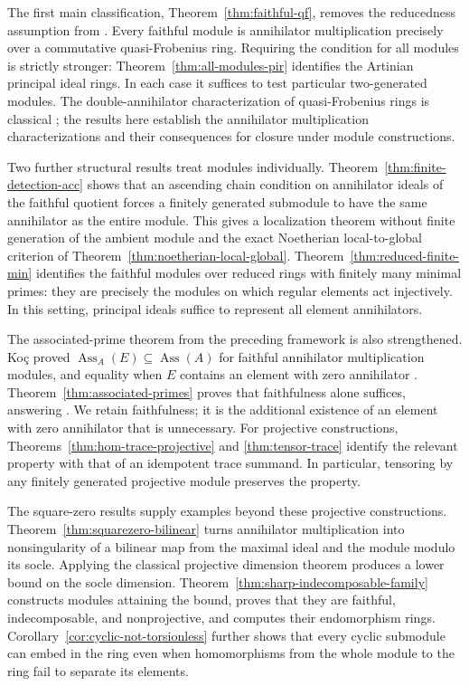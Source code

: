 \documentclass[11pt]{amsart}
\theoremstyle{plain}
\theoremstyle{definition}
\theoremstyle{remark}
\DeclareMathOperator{\Ass}{Ass}
\numberwithin{equation}{section}
\begin{document}
The first main classification, Theorem~\ref{thm:faithful-qf}, removes the
reducedness assumption from \cite[Theorem~5]{KocAMM}.
Every faithful module is annihilator multiplication precisely over a
commutative quasi-Frobenius ring. Requiring the condition for all modules
is strictly stronger: Theorem~\ref{thm:all-modules-pir} identifies the
Artinian principal ideal rings. In each case it suffices to test particular
two-generated modules. The double-annihilator characterization of
quasi-Frobenius rings is classical \cite{Lam99, Storrer69}; the results here
establish the annihilator multiplication characterizations and their
consequences for closure under module constructions.

Two further structural results treat modules individually.
Theorem~\ref{thm:finite-detection-acc} shows that an ascending chain condition
on annihilator ideals of the faithful quotient forces a finitely generated
submodule to have the same annihilator as the entire module.
This gives a localization theorem without finite generation of the ambient
module and the exact Noetherian local-to-global criterion of
Theorem~\ref{thm:noetherian-local-global}.
Theorem~\ref{thm:reduced-finite-min} identifies the faithful modules over
reduced rings with finitely many minimal primes: they are precisely the
modules on which regular elements act injectively. In this setting,
principal ideals suffice to represent all element annihilators.

The associated-prime theorem from the preceding framework is also
strengthened. Ko\c{c} proved $\Ass_A(E)\subseteq\Ass(A)$ for faithful
annihilator multiplication modules, and equality when $E$ contains an
element with zero annihilator \cite[Theorem~6]{KocAMM}.
Theorem~\ref{thm:associated-primes} proves that faithfulness alone suffices,
answering \cite[Question~1]{KocAMM}. We retain faithfulness; it is the
additional existence of an element with zero annihilator that is unnecessary.
For projective constructions, Theorems~\ref{thm:hom-trace-projective}
and \ref{thm:tensor-trace} identify the relevant property with that of an
idempotent trace summand. In particular, tensoring by any finitely
generated projective module preserves the property.

The square-zero results supply examples beyond these projective constructions.
Theorem~\ref{thm:squarezero-bilinear} turns annihilator multiplication into
nonsingularity of a bilinear map from the maximal ideal and the module
modulo its socle. Applying the classical projective dimension theorem
produces a lower bound on the socle dimension.
Theorem~\ref{thm:sharp-indecomposable-family} constructs modules attaining
the bound, proves that they are faithful, indecomposable, and nonprojective,
and computes their endomorphism rings.
Corollary~\ref{cor:cyclic-not-torsionless} further shows that every
cyclic submodule can embed in the ring even when homomorphisms from the
whole module to the ring fail to separate its elements.
\end{document}

